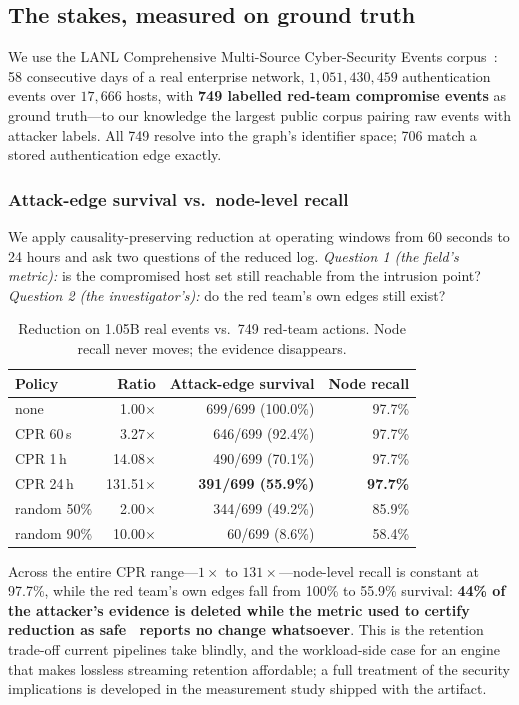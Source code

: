 \documentclass[11pt,letterpaper,twocolumn]{article}
\begin{document}
\subsection{The stakes, measured on ground truth}
\label{sec:evidence}

We use the LANL Comprehensive Multi-Source Cyber-Security Events
corpus~\cite{lanl2015data}: 58 consecutive days of a real enterprise
network, $1{,}051{,}430{,}459$ authentication events over $17{,}666$
hosts, with \textbf{749 labelled red-team compromise events} as ground
truth---to our knowledge the largest public corpus pairing raw events
with attacker labels. All 749 resolve into the graph's identifier
space; 706 match a stored authentication edge exactly.

\subsubsection{Attack-edge survival vs.\ node-level recall}
\label{sec:evidence-survival}
We apply causality-preserving reduction at operating windows from 60
seconds to 24 hours and ask two questions of the reduced log.
\emph{Question 1 (the field's metric):} is the compromised host set
still reachable from the intrusion point? \emph{Question 2 (the
investigator's):} do the red team's own edges still exist?

\begin{table}[h]
\centering\small
\caption{Reduction on 1.05B real events vs.\ 749 red-team actions.
Node recall never moves; the evidence disappears.}
\label{tab:e8}
\begin{tabular}{lrrr}
\toprule
Policy & Ratio & Attack-edge survival & Node recall \\
\midrule
none            & 1.00$\times$   & 699/699 (100.0\%) & 97.7\% \\
CPR 60\,s       & 3.27$\times$   & 646/699 (92.4\%)  & 97.7\% \\
CPR 1\,h        & 14.08$\times$  & 490/699 (70.1\%)  & 97.7\% \\
CPR 24\,h       & 131.51$\times$ & \textbf{391/699 (55.9\%)} & \textbf{97.7\%} \\
random 50\%     & 2.00$\times$   & 344/699 (49.2\%)  & 85.9\% \\
random 90\%     & 10.00$\times$  & 60/699 (8.6\%)    & 58.4\% \\
\bottomrule
\end{tabular}
\end{table}

Across the entire CPR range---$1\times$ to $131\times$---node-level
recall is constant at 97.7\%, while the red team's own edges fall
from 100\% to 55.9\% survival: \textbf{44\% of the attacker's
evidence is deleted while the metric used to certify reduction as
safe~\cite{zhang2025tapas} reports no change whatsoever}. This is
the retention trade-off current pipelines take blindly, and the
workload-side case for an engine that makes lossless streaming
retention affordable; a full treatment of the security implications
is developed in the measurement study shipped with the artifact.
\end{document}
